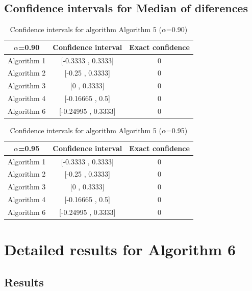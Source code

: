\documentclass[a4paper,10pt]{article}
\begin{document}
\subsection{Confidence intervals for Median of diferences}

\begin{table}[!htp]
\centering\small
\begin{tabular}{
|c|c|c|}
\hline
 $\alpha$=0.90 & Confidence interval & Exact confidence \\ \hline 
Algorithm 1 & [-0.3333 , 0.3333] & 0\\ \hline 
Algorithm 2 & [-0.25 , 0.3333] & 0\\ \hline 
Algorithm 3 & [0 , 0.3333] & 0\\ \hline 
Algorithm 4 & [-0.16665 , 0.5] & 0\\ \hline 
Algorithm 6 & [-0.24995 , 0.3333] & 0\\ \hline 

\end{tabular}
\caption{Confidence intervals for algorithm Algorithm 5 ($\alpha$=0.90)}
\end{table}
\begin{table}[!htp]
\centering\small
\begin{tabular}{
|c|c|c|}
\hline
 $\alpha$=0.95 & Confidence interval & Exact confidence \\ \hline 
Algorithm 1 & [-0.3333 , 0.3333] & 0\\ \hline 
Algorithm 2 & [-0.25 , 0.3333] & 0\\ \hline 
Algorithm 3 & [0 , 0.3333] & 0\\ \hline 
Algorithm 4 & [-0.16665 , 0.5] & 0\\ \hline 
Algorithm 6 & [-0.24995 , 0.3333] & 0\\ \hline 

\end{tabular}
\caption{Confidence intervals for algorithm Algorithm 5 ($\alpha$=0.95)}
\end{table}

 \clearpage 


\section{Detailed results for Algorithm 6}


\subsection{Results}
\end{document}
